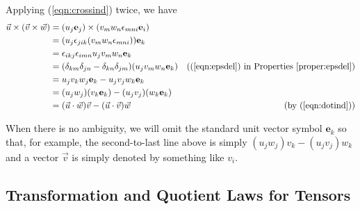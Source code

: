\begin{solution}
Applying (\ref{eqn:crossind}) twice, we have
\begin{align*}
\vec{u} \times (\vec{v} \times \vec{w}) &= (u_j\textbf{e}_j) \times (v_mw_n\epsilon_{mni}\textbf{e}_i) \\
&= (u_j\epsilon_{jik}(v_mw_n\epsilon_{mni})) \textbf{e}_k \\
&= \epsilon_{ikj}\epsilon_{imn}u_jv_mw_n \textbf{e}_k \\
&= (\delta_{km}\delta_{jn} - \delta_{kn}\delta_{jm})(u_jv_mw_n \textbf{e}_k) & \text{((\ref{eqn:epsdel}) in Properties \ref{proper:epsdel})} \\
&= u_jv_kw_j \textbf{e}_k - u_jv_jw_k \textbf{e}_k \\
&= (u_jw_j)(v_k\textbf{e}_k) - (u_jv_j)(w_k \textbf{e}_k) \\
&= (\vec{u} \cdot \vec{w})\vec{v} - (\vec{u} \cdot \vec{v})\vec{w} & \text{(by (\ref{eqn:dotind}))}
\end{align*}
\end{solution}
When there is no ambiguity, we will omit the standard unit vector symbol $\textbf{e}_k$ so that, for example, the second-to-last line above is simply $(u_jw_j)v_k - (u_jv_j)w_k$ and a vector $\vec{v}$ is simply denoted by something like $v_i$.

\subsection{Transformation and Quotient Laws for Tensors}

